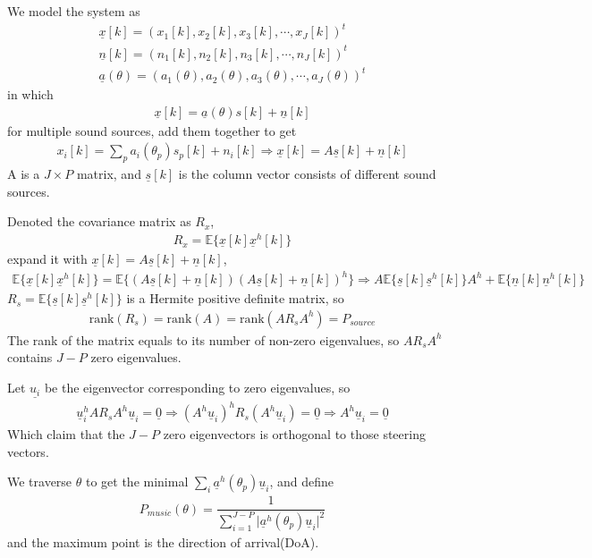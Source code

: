 \documentclass[UTF8]{article}
\newcommand{\ul}{\underline}
\begin{document}
We model the system as
\begin{gather*}
    \ul{x}[k] = (x_1[k], x_2[k], x_3[k], \cdots, x_J[k])^t \\
    \ul{n}[k] = (n_1[k], n_2[k], n_3[k], \cdots, n_J[k])^t \\
    \ul{a}(\theta) = (a_1(\theta), a_2(\theta), a_3(\theta), \cdots, a_J(\theta))^t
\end{gather*}
in which 
\begin{gather}
    \ul{x}[k] = \ul{a}(\theta) s[k] + \ul{n}[k]
\end{gather}
for multiple sound sources, add them together to get
\begin{gather}
    x_i[k] = \sum_{p}a_i(\theta_p) s_p[k] + n_i[k] \Rightarrow \ul{x}[k] = A \ul{s}[k] + \ul{n}[k]
\end{gather}
A is a $J \times P$ matrix, and $\ul{s}[k]$ is the column vector consists of different sound sources.

Denoted the covariance matrix as $R_x$, 
\begin{gather}
   R_x = \mathbb{E}\{\ul{x}[k]\ul{x}^h[k]\} 
\end{gather}
expand it with $\ul{x}[k] = A \ul{s}[k] + \ul{n}[k]$, 
\begin{gather}
    \mathbb{E}\{\ul{x}[k]\ul{x}^h[k]\} = \mathbb{E} \{ (A \ul{s}[k] + \ul{n}[k])(A \ul{s}[k] + \ul{n}[k])^h \} \Rightarrow A \mathbb{E}\{ \ul{s}[k]\ul{s}^h[k] \}A^h + \mathbb{E}\{ \ul{n}[k] \ul{n}^h[k]\}
\end{gather}
$R_s = \mathbb{E}\{ \ul{s}[k]\ul{s}^h[k] \}$ is a Hermite positive definite matrix, so 
\begin{gather*}
   \mathrm{rank}(R_s) = \mathrm{rank}(A) = \mathrm{rank}(A R_s A^h) = P_{source}
\end{gather*}
The rank of the matrix equals to its number of non-zero eigenvalues, so $A R_s A^h$ contains $J - P$ zero eigenvalues. 

Let $\ul{u_i}$ be the eigenvector corresponding to zero eigenvalues, so 
\begin{gather}
    \ul{u}_i^h A R_s A^h \ul{u}_i = \ul{0} \Rightarrow (A^h\ul{u}_i)^h R_s (A^h \ul{u}_i) = \ul{0} \Rightarrow A^h\ul{u}_i = \ul{0}
\end{gather}
Which claim that the $J - P$ zero eigenvectors is orthogonal to those steering vectors.

We traverse $\theta$ to get the minimal $\sum_{i}\ul{a}^h(\theta_p)\ul{u}_i$, and define
\begin{gather}
    P_{music}(\theta) = \dfrac{1}{\sum_{i = 1}^{J - P}\big|\ul{a}^h(\theta_p)\ul{u}_i \big|^2}
\end{gather}
and the maximum point is the direction of arrival(DoA).
\end{document}
